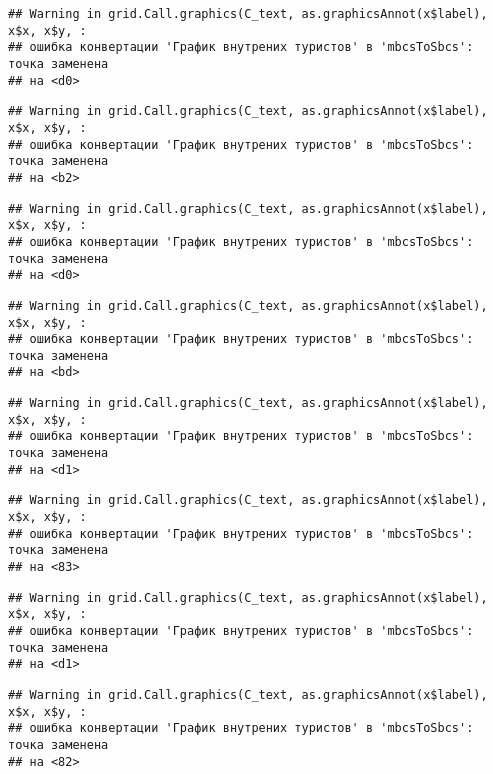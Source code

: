 \documentclass[
]{article}
\begin{document}
\begin{verbatim}
## Warning in grid.Call.graphics(C_text, as.graphicsAnnot(x$label), x$x, x$y, :
## ошибка конвертации 'График внутрених туристов' в 'mbcsToSbcs': точка заменена
## на <d0>
\end{verbatim}

\begin{verbatim}
## Warning in grid.Call.graphics(C_text, as.graphicsAnnot(x$label), x$x, x$y, :
## ошибка конвертации 'График внутрених туристов' в 'mbcsToSbcs': точка заменена
## на <b2>
\end{verbatim}

\begin{verbatim}
## Warning in grid.Call.graphics(C_text, as.graphicsAnnot(x$label), x$x, x$y, :
## ошибка конвертации 'График внутрених туристов' в 'mbcsToSbcs': точка заменена
## на <d0>
\end{verbatim}

\begin{verbatim}
## Warning in grid.Call.graphics(C_text, as.graphicsAnnot(x$label), x$x, x$y, :
## ошибка конвертации 'График внутрених туристов' в 'mbcsToSbcs': точка заменена
## на <bd>
\end{verbatim}

\begin{verbatim}
## Warning in grid.Call.graphics(C_text, as.graphicsAnnot(x$label), x$x, x$y, :
## ошибка конвертации 'График внутрених туристов' в 'mbcsToSbcs': точка заменена
## на <d1>
\end{verbatim}

\begin{verbatim}
## Warning in grid.Call.graphics(C_text, as.graphicsAnnot(x$label), x$x, x$y, :
## ошибка конвертации 'График внутрених туристов' в 'mbcsToSbcs': точка заменена
## на <83>
\end{verbatim}

\begin{verbatim}
## Warning in grid.Call.graphics(C_text, as.graphicsAnnot(x$label), x$x, x$y, :
## ошибка конвертации 'График внутрених туристов' в 'mbcsToSbcs': точка заменена
## на <d1>
\end{verbatim}

\begin{verbatim}
## Warning in grid.Call.graphics(C_text, as.graphicsAnnot(x$label), x$x, x$y, :
## ошибка конвертации 'График внутрених туристов' в 'mbcsToSbcs': точка заменена
## на <82>
\end{verbatim}
\end{document}
